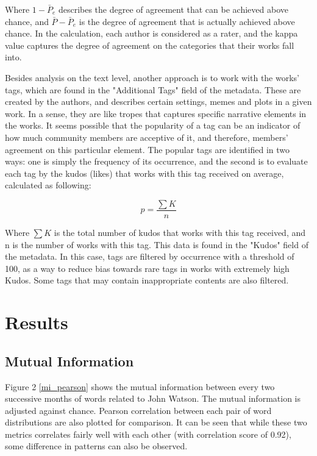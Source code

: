 \documentclass{pnastwo}
\begin{document}
\begin{article}
Where $1-\bar{P}_e$ describes the degree of agreement that can be achieved above chance, and $\bar{P} - \bar{P}_e$ is the degree of agreement that is actually achieved above chance. In the calculation, each author is considered as a rater, and the kappa value captures the degree of agreement on the categories that their works fall into. 

Besides analysis on the text level, another approach is to work with the works' tags, which are found in the "Additional Tags" field of the metadata. These are created by the authors, and describes certain settings, memes and plots in a given work. In a sense, they are like tropes that captures specific narrative elements in the works. It seems possible that the popularity of a tag can be an indicator of how much community members are acceptive of it, and therefore, members' agreement on this particular element. The popular tags are identified in two ways: one is simply the frequency of its occurrence, and the second is to evaluate each tag by the kudos (likes) that works with this tag received on average, calculated as following:

\begin{equation}
p = \frac{\sum{K}}{n}
\end{equation}

Where $\sum{K}$ is the total number of kudos that works with this tag received, and n is the number of works with this tag. This data is found in the "Kudos" field of the metadata. In this case, tags are filtered by occurrence with a threshold of 100, as a way to reduce bias towards rare tags in works with extremely high Kudos. Some tags that may contain inappropriate contents are also filtered. 


\section{Results}
\subsection{Mutual Information} Figure 2 \ref{mi_pearson} shows the mutual information between every two successive months of words related to John Watson. The mutual information is adjusted against chance. Pearson correlation between each pair of word distributions are also plotted for comparison. It can be seen that while these two metrics correlates fairly well with each other (with correlation score of 0.92),  some difference in  patterns can also be observed.


\end{article}
\end{document}
